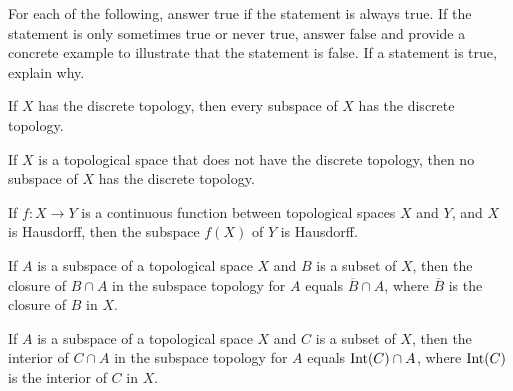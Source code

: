 \item For each of the following, answer true if the statement is always true. If the statement is only sometimes true or never true, answer false and provide a concrete example to illustrate that the statement is false. If a statement is true, explain why. 
	\ba
	\item If $X$ has the discrete topology, then every subspace of $X$ has the discrete topology. 
		
	\item If $X$ is a topological space that does not have the discrete topology, then no subspace of $X$ has the discrete topology.

	\item If $f : X \to Y$ is a continuous function between topological spaces $X$ and $Y$, and $X$ is Hausdorff, then the subspace $f(X)$ of $Y$ is Hausdorff.

	\item If $A$ is a subspace of a topological space $X$ and $B$ is a subset of $X$, then the closure of $B \cap A$ in the subspace topology for $A$ equals $\overline{B} \cap A$, where $\overline{B}$ is the closure of $B$ in $X$. 
	
	\item If $A$ is a subspace of a topological space $X$ and $C$ is a subset of $X$, then the interior of $C \cap A$ in the subspace topology for $A$ equals $\text{Int}(C) \cap A$, where $\text{Int}(C)$ is the interior of $C$ in $X$. 
		
	\ea

